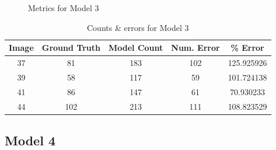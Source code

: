 \begin{appendices}
\begin{figure}[h!]
\caption{Metrics for Model 3}
\end{figure}

\begin{table}[h!]
\centering
\begin{tabular}{||c c c c c||} 
\hline
Image &  Ground Truth &  Model Count &  Num. Error &    \% Error \\
\hline\hline
37 &            81 &          183 &         102 &  125.925926 \\
39 &            58 &          117 &          59 &  101.724138 \\
41 &            86 &          147 &          61 &   70.930233 \\
44 &           102 &          213 &         111 &  108.823529 \\
\hline
\end{tabular}
\caption{Counts \& errors for Model 3}
\label{count_3}
\end{table}

\subsection{Model 4}


\end{appendices}
